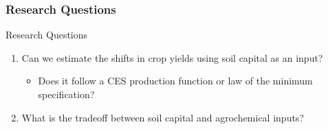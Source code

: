 \documentclass[xcolor = x11names, compress, aspectratio = 169]{beamer}
\renewcommand{\(}{\begin{columns}}
\renewcommand{\)}{\end{columns}}
\newcommand{\<}[1]{\begin{column}{#1}}
\renewcommand{\>}{\end{column}}
\begin{document}
    \begin{frame}
    \frametitle{Research Questions}
        \begin{block}{Research Questions}
            \begin{enumerate}
            \item Can we estimate the shifts in crop yields using soil capital as an input?
            \begin{itemize}
                \item Does it follow a CES production function or law of the minimum specification?
            \end{itemize}
            \item What is the tradeoff between soil capital and agrochemical inputs?
            \end{enumerate}
        \end{block}
    \end{frame}

\end{document}

